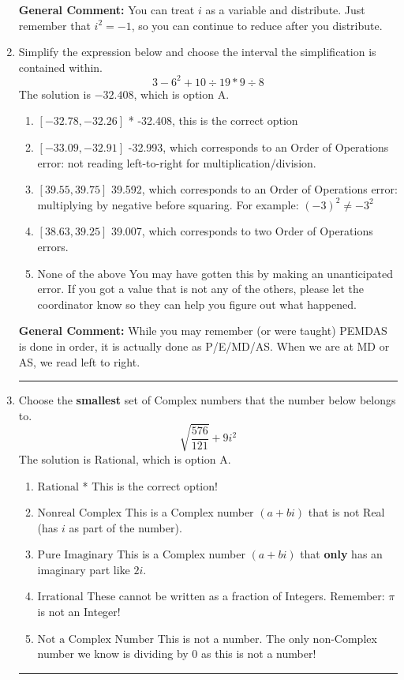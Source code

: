 \documentclass{extbook}[14pt]
\newcommand{\litem}[1]{\item #1

\rule{\textwidth}{0.4pt}}
\begin{document}
\begin{enumerate}
{\textbf{General Comment:} You can treat $i$ as a variable and distribute. Just remember that $i^2=-1$, so you can continue to reduce after you distribute.
}

\litem{
Simplify the expression below and choose the interval the simplification is contained within.
\[ 3 - 6^2 + 10 \div 19 * 9 \div 8 \]
The solution is \( -32.408 \), which is option A.\begin{enumerate}[label=\Alph*.]
\item \( [-32.78, -32.26] \)
* -32.408, this is the correct option
\item \( [-33.09, -32.91] \)
 -32.993, which corresponds to an Order of Operations error: not reading left-to-right for multiplication/division.
\item \( [39.55, 39.75] \)
 39.592, which corresponds to an Order of Operations error: multiplying by negative before squaring. For example: $(-3)^2 \neq -3^2$
\item \( [38.63, 39.25] \)
 39.007, which corresponds to two Order of Operations errors.
\item \( \text{None of the above} \)
 You may have gotten this by making an unanticipated error. If you got a value that is not any of the others, please let the coordinator know so they can help you figure out what happened.
\end{enumerate}

\textbf{General Comment:} While you may remember (or were taught) PEMDAS is done in order, it is actually done as P/E/MD/AS. When we are at MD or AS, we read left to right.
}
\litem{
Choose the \textbf{smallest} set of Complex numbers that the number below belongs to.
\[ \sqrt{\frac{576}{121}} + 9i^2 \]
The solution is \( \text{Rational} \), which is option A.\begin{enumerate}[label=\Alph*.]
\item \( \text{Rational} \)
* This is the correct option!
\item \( \text{Nonreal Complex} \)
This is a Complex number $(a+bi)$ that is not Real (has $i$ as part of the number).
\item \( \text{Pure Imaginary} \)
This is a Complex number $(a+bi)$ that \textbf{only} has an imaginary part like $2i$.
\item \( \text{Irrational} \)
These cannot be written as a fraction of Integers. Remember: $\pi$ is not an Integer!
\item \( \text{Not a Complex Number} \)
This is not a number. The only non-Complex number we know is dividing by 0 as this is not a number!
\end{enumerate}

}
\end{enumerate}
\end{document}
